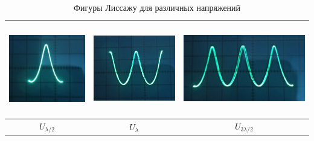 \documentclass[a4paper,12pt]{article} %
\begin{document}
\begin{table}[h]
\centering
\begin{tabular}{|c|c|c|}
\hline
\includegraphics[height=4cm]{liss1.jpg}  & \includegraphics[height=4cm]{liss2.jpg}  &  \includegraphics[height=4cm]{liss3.jpg} \\ \hline
$U_{\lambda/2}$ & $U_{\lambda}$ & $U_{3\lambda/2}$ \\ \hline
\end{tabular}
\caption{Фигуры Лиссажу для различных напряжений}
\label{tab:my-table}
\end{table}
\end{document}
